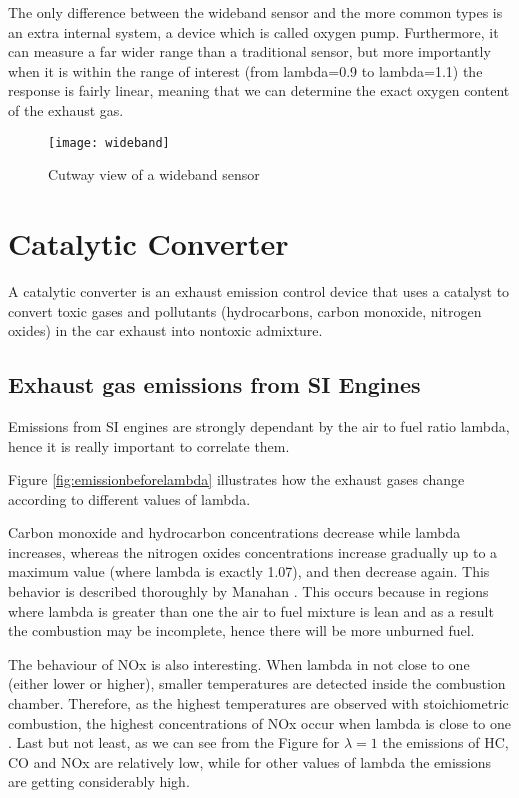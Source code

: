 The only difference between the wideband sensor and the more common types is an extra internal system, a device which is called oxygen pump. Furthermore, it can measure a far wider range than a traditional sensor, but more importantly when it is within the range of interest (from lambda=0.9 to lambda=1.1) the response is fairly linear, meaning that we can determine the exact oxygen content of the exhaust gas.


\begin{figure}[H]
    \centering
    \texttt{[image: wideband]}
    \caption{Cutway view of a wideband sensor \cite{wideband}}
    \label{fig:wideband}
\end{figure}

\section{Catalytic Converter}
A catalytic converter is an exhaust emission control device that uses a catalyst to convert toxic gases and pollutants (hydrocarbons, carbon monoxide, nitrogen oxides) in the car exhaust into nontoxic admixture.

\subsection{Exhaust gas emissions from  SI Engines}
Emissions from SI engines are strongly dependant by the air to fuel ratio lambda, hence it is really important to correlate them.

Figure \ref{fig:emissionbeforelambda} illustrates how the exhaust gases change according to different values of lambda.

Carbon monoxide and hydrocarbon concentrations decrease while lambda increases, whereas the nitrogen oxides concentrations increase gradually up to a maximum value (where lambda is exactly 1.07), and then decrease again. This behavior is described thoroughly by Manahan \cite{manahan}.
This occurs because in regions where lambda is greater than one the air to fuel mixture is lean and as a result the combustion may be incomplete, hence there will be more unburned fuel.

The behaviour of NOx is also interesting. When lambda in not close to one (either lower or higher), smaller temperatures are detected inside the combustion chamber. Therefore, as the highest temperatures are observed with stoichiometric combustion, the highest concentrations of NOx occur when lambda is close to one \cite{heywood1988internal}. Last but not least, as we can see from the Figure  for $\lambda=1$ the emissions of HC, CO and NOx are relatively low, while for other values of lambda the emissions are getting considerably high.

